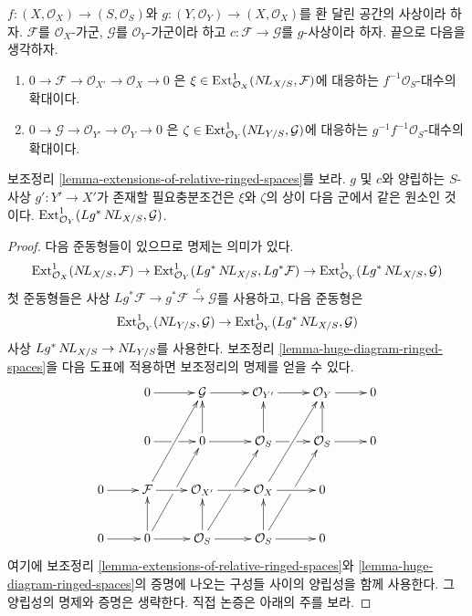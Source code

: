 \begin{lemma}
\label{lemma-extensions-of-relative-ringed-spaces-functorial}
$f : (X, \mathcal{O}_X) \to (S, \mathcal{O}_S)$와
$g : (Y, \mathcal{O}_Y) \to (X, \mathcal{O}_X)$를 환 달린 공간의
사상이라 하자. $\mathcal{F}$를 $\mathcal{O}_X$-가군,
$\mathcal{G}$를 $\mathcal{O}_Y$-가군이라 하고
$c : \mathcal{F} \to \mathcal{G}$를 $g$-사상이라 하자. 끝으로 다음을
생각하자.
\begin{enumerate}
\item[(a)] $0 \to \mathcal{F} \to \mathcal{O}_{X'} \to \mathcal{O}_X \to 0$
은 $\xi \in \mathop{\mathrm{Ext}}\nolimits^1_{\mathcal{O}_X}(\mathop{N\!L}\nolimits_{X/S}, \mathcal{F})$에 대응하는
$f^{-1}\mathcal{O}_S$-대수의 확대이다.
\item[(b)] $0 \to \mathcal{G} \to \mathcal{O}_{Y'} \to \mathcal{O}_Y \to 0$
은 $\zeta \in \mathop{\mathrm{Ext}}\nolimits^1_{\mathcal{O}_Y}(\mathop{N\!L}\nolimits_{Y/S}, \mathcal{G})$에 대응하는
$g^{-1}f^{-1}\mathcal{O}_S$-대수의 확대이다.
\end{enumerate}
보조정리 \ref{lemma-extensions-of-relative-ringed-spaces}를 보라.
$g$ 및 $c$와 양립하는 $S$-사상 $g' : Y' \to X'$가 존재할
필요충분조건은 $\xi$와 $\zeta$의 상이 다음 군에서 같은 원소인
것이다.
$\mathop{\mathrm{Ext}}\nolimits^1_{\mathcal{O}_Y}(Lg^*\mathop{N\!L}\nolimits_{X/S}, \mathcal{G})$.
\end{lemma}

\begin{proof}
다음 준동형들이 있으므로 명제는 의미가 있다.
$$
\mathop{\mathrm{Ext}}\nolimits^1_{\mathcal{O}_X}(\mathop{N\!L}\nolimits_{X/S}, \mathcal{F}) \to
\mathop{\mathrm{Ext}}\nolimits^1_{\mathcal{O}_Y}(Lg^*\mathop{N\!L}\nolimits_{X/S}, Lg^*\mathcal{F}) \to
\mathop{\mathrm{Ext}}\nolimits^1_{\mathcal{O}_Y}(Lg^*\mathop{N\!L}\nolimits_{X/S}, \mathcal{G})
$$
첫 준동형들은 사상
$Lg^*\mathcal{F} \to g^*\mathcal{F} \xrightarrow{c} \mathcal{G}$를
사용하고, 다음 준동형은
$$
\mathop{\mathrm{Ext}}\nolimits^1_{\mathcal{O}_Y}(\mathop{N\!L}\nolimits_{Y/S}, \mathcal{G}) \to
\mathop{\mathrm{Ext}}\nolimits^1_{\mathcal{O}_Y}(Lg^*\mathop{N\!L}\nolimits_{X/S}, \mathcal{G})
$$
사상 $Lg^*\mathop{N\!L}\nolimits_{X/S} \to \mathop{N\!L}\nolimits_{Y/S}$를 사용한다. 보조정리
\ref{lemma-huge-diagram-ringed-spaces}을 다음 도표에 적용하면
보조정리의 명제를 얻을 수 있다.
$$
\xymatrix{
& 0 \ar[r] &
\mathcal{G} \ar[r] &
\mathcal{O}_{Y'} \ar[r] &
\mathcal{O}_Y \ar[r] & 0 \\
& 0 \ar[r]|\hole & 0 \ar[u] \ar[r] &
\mathcal{O}_S \ar[u] \ar[r]|\hole &
\mathcal{O}_S \ar[u] \ar[r] & 0 \\
0 \ar[r] &
\mathcal{F} \ar[ruu] \ar[r] &
\mathcal{O}_{X'} \ar[r] &
\mathcal{O}_X \ar[ruu] \ar[r] & 0 \\
0 \ar[r] & 0 \ar[ruu]|\hole \ar[u] \ar[r] &
\mathcal{O}_S \ar[ruu]|\hole \ar[u] \ar[r] &
\mathcal{O}_S \ar[ruu]|\hole \ar[u] \ar[r] & 0
}
$$
여기에 보조정리 \ref{lemma-extensions-of-relative-ringed-spaces}와
\ref{lemma-huge-diagram-ringed-spaces}의 증명에 나오는 구성들 사이의
양립성을 함께 사용한다. 그 양립성의 명제와 증명은 생략한다. 직접
논증은 아래의 주를 보라.
\end{proof}

